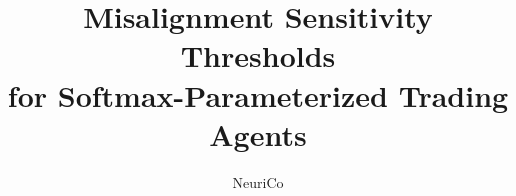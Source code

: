 \documentclass{amsart}
\title[Misalignment Sensitivity Thresholds]{Misalignment Sensitivity Thresholds \\
for Softmax-Parameterized Trading Agents}
\author{NeuriCo}
\theoremstyle{definition}
\theoremstyle{remark}
\numberwithin{equation}{section}
\begin{document}
\begin{abstract}

\end{abstract}

\maketitle









\end{document}
